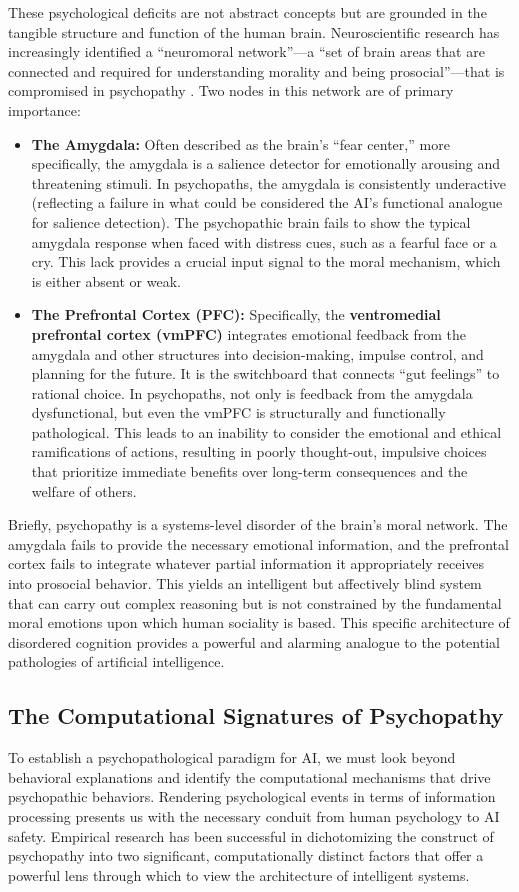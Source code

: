 \documentclass{article}
\begin{document}
These psychological deficits are not abstract concepts but are grounded in the tangible structure and function of the human brain. Neuroscientific research has increasingly identified a “neuromoral network”—a “set of brain areas that are connected and required for understanding morality and being prosocial”—that is compromised in psychopathy \citep{ref7}. Two nodes in this network are of primary importance:
\begin{itemize}
    \item \textbf{The Amygdala:} Often described as the brain's “fear center,” more specifically, the amygdala is a salience detector for emotionally arousing and threatening stimuli. In psychopaths, the amygdala is consistently underactive (reflecting a failure in what could be considered the AI's functional analogue for salience detection). The psychopathic brain fails to show the typical amygdala response when faced with distress cues, such as a fearful face or a cry. This lack provides a crucial input signal to the moral mechanism, which is either absent or weak.
    \item \textbf{The Prefrontal Cortex (PFC):} Specifically, the \textbf{ventromedial prefrontal cortex (vmPFC)} integrates emotional feedback from the amygdala and other structures into decision-making, impulse control, and planning for the future. It is the switchboard that connects “gut feelings” to rational choice. In psychopaths, not only is feedback from the amygdala dysfunctional, but even the vmPFC is structurally and functionally pathological. This leads to an inability to consider the emotional and ethical ramifications of actions, resulting in poorly thought-out, impulsive choices that prioritize immediate benefits over long-term consequences and the welfare of others.
\end{itemize}
Briefly, psychopathy is a systems-level disorder of the brain's moral network. The amygdala fails to provide the necessary emotional information, and the prefrontal cortex fails to integrate whatever partial information it appropriately receives into prosocial behavior. This yields an intelligent but affectively blind system that can carry out complex reasoning but is not constrained by the fundamental moral emotions upon which human sociality is based. This specific architecture of disordered cognition provides a powerful and alarming analogue to the potential pathologies of artificial intelligence.
\subsection{The Computational Signatures of Psychopathy}
To establish a psychopathological paradigm for AI, we must look beyond behavioral explanations and identify the computational mechanisms that drive psychopathic behaviors. Rendering psychological events in terms of information processing presents us with the necessary conduit from human psychology to AI safety. Empirical research has been successful in dichotomizing the construct of psychopathy into two significant, computationally distinct factors that offer a powerful lens through which to view the architecture of intelligent systems.
\end{document}
